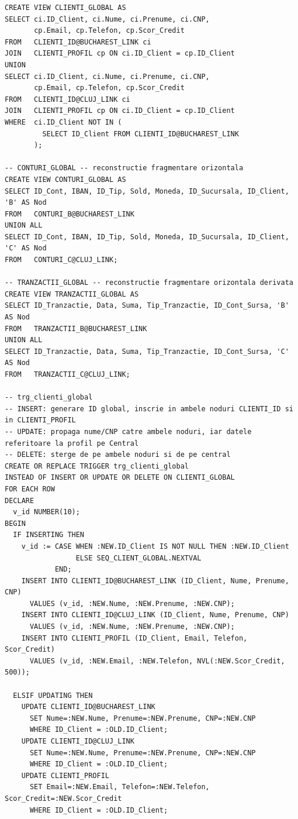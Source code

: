 \documentclass[12pt,a4paper]{article}
\begin{document}
\begin{lstlisting}
CREATE VIEW CLIENTI_GLOBAL AS
SELECT ci.ID_Client, ci.Nume, ci.Prenume, ci.CNP,
       cp.Email, cp.Telefon, cp.Scor_Credit
FROM   CLIENTI_ID@BUCHAREST_LINK ci
JOIN   CLIENTI_PROFIL cp ON ci.ID_Client = cp.ID_Client
UNION
SELECT ci.ID_Client, ci.Nume, ci.Prenume, ci.CNP,
       cp.Email, cp.Telefon, cp.Scor_Credit
FROM   CLIENTI_ID@CLUJ_LINK ci
JOIN   CLIENTI_PROFIL cp ON ci.ID_Client = cp.ID_Client
WHERE  ci.ID_Client NOT IN (
         SELECT ID_Client FROM CLIENTI_ID@BUCHAREST_LINK
       );

-- CONTURI_GLOBAL -- reconstructie fragmentare orizontala
CREATE VIEW CONTURI_GLOBAL AS
SELECT ID_Cont, IBAN, ID_Tip, Sold, Moneda, ID_Sucursala, ID_Client, 'B' AS Nod
FROM   CONTURI_B@BUCHAREST_LINK
UNION ALL
SELECT ID_Cont, IBAN, ID_Tip, Sold, Moneda, ID_Sucursala, ID_Client, 'C' AS Nod
FROM   CONTURI_C@CLUJ_LINK;

-- TRANZACTII_GLOBAL -- reconstructie fragmentare orizontala derivata
CREATE VIEW TRANZACTII_GLOBAL AS
SELECT ID_Tranzactie, Data, Suma, Tip_Tranzactie, ID_Cont_Sursa, 'B' AS Nod
FROM   TRANZACTII_B@BUCHAREST_LINK
UNION ALL
SELECT ID_Tranzactie, Data, Suma, Tip_Tranzactie, ID_Cont_Sursa, 'C' AS Nod
FROM   TRANZACTII_C@CLUJ_LINK;

-- trg_clienti_global
-- INSERT: generare ID global, inscrie in ambele noduri CLIENTI_ID si in CLIENTI_PROFIL
-- UPDATE: propaga nume/CNP catre ambele noduri, iar datele referitoare la profil pe Central
-- DELETE: sterge de pe ambele noduri si de pe central
CREATE OR REPLACE TRIGGER trg_clienti_global
INSTEAD OF INSERT OR UPDATE OR DELETE ON CLIENTI_GLOBAL
FOR EACH ROW
DECLARE
  v_id NUMBER(10);
BEGIN
  IF INSERTING THEN
    v_id := CASE WHEN :NEW.ID_Client IS NOT NULL THEN :NEW.ID_Client
                 ELSE SEQ_CLIENT_GLOBAL.NEXTVAL
            END;
    INSERT INTO CLIENTI_ID@BUCHAREST_LINK (ID_Client, Nume, Prenume, CNP)
      VALUES (v_id, :NEW.Nume, :NEW.Prenume, :NEW.CNP);
    INSERT INTO CLIENTI_ID@CLUJ_LINK (ID_Client, Nume, Prenume, CNP)
      VALUES (v_id, :NEW.Nume, :NEW.Prenume, :NEW.CNP);
    INSERT INTO CLIENTI_PROFIL (ID_Client, Email, Telefon, Scor_Credit)
      VALUES (v_id, :NEW.Email, :NEW.Telefon, NVL(:NEW.Scor_Credit, 500));

  ELSIF UPDATING THEN
    UPDATE CLIENTI_ID@BUCHAREST_LINK
      SET Nume=:NEW.Nume, Prenume=:NEW.Prenume, CNP=:NEW.CNP
      WHERE ID_Client = :OLD.ID_Client;
    UPDATE CLIENTI_ID@CLUJ_LINK
      SET Nume=:NEW.Nume, Prenume=:NEW.Prenume, CNP=:NEW.CNP
      WHERE ID_Client = :OLD.ID_Client;
    UPDATE CLIENTI_PROFIL
      SET Email=:NEW.Email, Telefon=:NEW.Telefon, Scor_Credit=:NEW.Scor_Credit
      WHERE ID_Client = :OLD.ID_Client;


\end{lstlisting}
\end{document}
